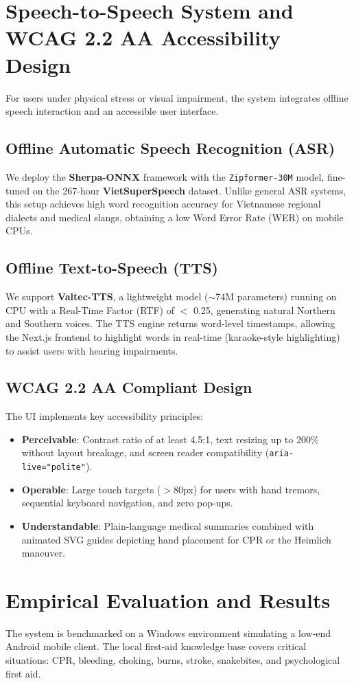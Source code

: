 \documentclass[journal,compsoc]{IEEEtran}
\begin{document}
\section{Speech-to-Speech System and WCAG 2.2 AA Accessibility Design}
For users under physical stress or visual impairment, the system integrates offline speech interaction and an accessible user interface.

\subsection{Offline Automatic Speech Recognition (ASR)}
We deploy the \textbf{Sherpa-ONNX} framework with the \texttt{Zipformer-30M} model, fine-tuned on the 267-hour \textbf{VietSuperSpeech} dataset. Unlike general ASR systems, this setup achieves high word recognition accuracy for Vietnamese regional dialects and medical slangs, obtaining a low Word Error Rate (WER) on mobile CPUs.

\subsection{Offline Text-to-Speech (TTS)}
We support \textbf{Valtec-TTS}, a lightweight model ($\sim$74M parameters) running on CPU with a Real-Time Factor (RTF) of $<$ 0.25, generating natural Northern and Southern voices. The TTS engine returns word-level timestamps, allowing the Next.js frontend to highlight words in real-time (karaoke-style highlighting) to assist users with hearing impairments.

\subsection{WCAG 2.2 AA Compliant Design}
The UI implements key accessibility principles:
\begin{itemize}
\item \textbf{Perceivable}: Contrast ratio of at least 4.5:1, text resizing up to 200\% without layout breakage, and screen reader compatibility (\texttt{aria-live="polite"}).
\item \textbf{Operable}: Large touch targets ($>$80px) for users with hand tremors, sequential keyboard navigation, and zero pop-ups.
\item \textbf{Understandable}: Plain-language medical summaries combined with animated SVG guides depicting hand placement for CPR or the Heimlich maneuver.
\end{itemize}

\section{Empirical Evaluation and Results}
The system is benchmarked on a Windows environment simulating a low-end Android mobile client. The local first-aid knowledge base covers critical situations: CPR, bleeding, choking, burns, stroke, snakebites, and psychological first aid.
\end{document}
